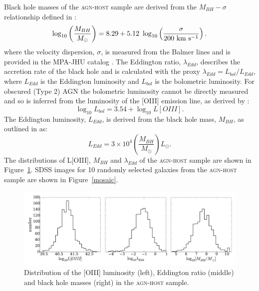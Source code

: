 Black hole masses of the \textsc{agn-host} sample are derived from the $M_{BH}-\sigma$ relationship defined in \citet{mcconnell11}:
\begin{equation}
\log_{10}\left(\frac{M_{BH}}{M_{\odot}}\right) = 8.29 + 5.12 ~\log_{10}\left(\frac{\sigma}{200 ~\rm{km} ~s^{-1}}\right). 
\end{equation}
where the velocity dispersion, $\sigma$, is measured from the Balmer lines and is provided in the MPA-JHU catalog \citep{kauffmann03, brinchmann04}. The Eddington ratio, $\lambda_{Edd}$, describes the accretion rate of the black hole and is calculated with the proxy $\lambda_{Edd} = L_{bol}/L_{Edd}$, where $L_{Edd}$ is the Eddington luminosity and $L_{bol}$ is the bolometric luminosity. For obscured (Type 2) AGN the bolometric luminosity cannot be directly measured and so is inferred from the luminosity of the [OIII] emission line, as derived by \citet{heckman04}:
\begin{equation}
\log_{10}L_{bol} = 3.54 + \log_{10}L[OIII]. 
\end{equation}
The Eddington luminosity, $L_{Edd}$, is derived from the black hole mass, $M_{BH}$, as outlined in \citet{binneymerrifield} as:
\begin{equation}
L_{Edd} = 3\times10^4 \left(\frac{M_{BH}}{M_{\odot}}\right) L_{\odot}.
\end{equation}
The distributions of L[OIII], $M_{BH}$ and $\lambda_{Edd}$ of the \textsc{agn-host} sample are shown in Figure~\ref{fig:agndistributions}. SDSS images for 10 randomly selected galaxies from the \textsc{agn-host} sample are shown in Figure~\ref{mosaic}.  

\begin{figure}
\includegraphics[width=\textwidth]{agn/agn-host_distributions_loiii_edd_ratio_mbh.pdf}
\caption[Distribution of measured galaxy parameters in the \textsc{agn-host} sample]{Distribution of the [OIII] luminosity (left), Eddington ratio (middle) and black hole masses (right) in the \textsc{agn-host} sample.}
\label{fig:agndistributions}
\end{figure}

